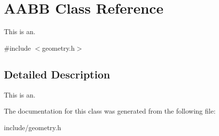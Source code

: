 \hypertarget{class_a_a_b_b}{}\section{A\+A\+BB Class Reference}
\label{class_a_a_b_b}


This is an.  




{\ttfamily \#include $<$geometry.\+h$>$}



\subsection{Detailed Description}
This is an. 

The documentation for this class was generated from the following file\+:\begin{DoxyCompactItemize}
\item 
include/geometry.\+h\end{DoxyCompactItemize}
